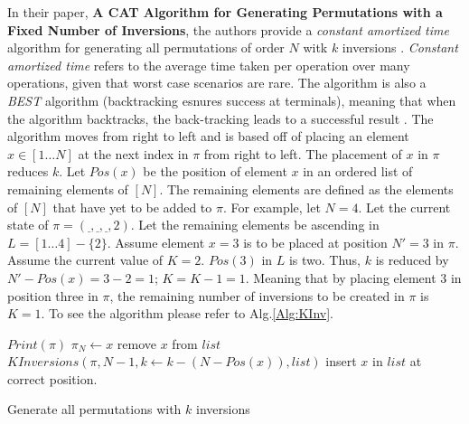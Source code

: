 In their paper, \textbf{A CAT Algorithm for Generating Permutations with a Fixed Number of Inversions}, the authors provide a 
\emph{constant amortized time} algorithm for generating all permutations of order $N$ witk $k$ inversions \cite{A26}. \emph{Constant amortized time}
refers to the average time taken per operation over many operations, given that worst case scenarios are rare. 
The algorithm is also a \emph{BEST} algorithm (backtracking esnures success at terminals), meaning that when the algorithm backtracks, 
the back-tracking leads to a successful result \cite{A26}. The algorithm moves from right to left and 
is based off of placing  an element $x \in [1 \dots N]$ at the next index in $\pi$ from right to left. The placement of $x$ in $\pi$ 
reduces $k$. Let $Pos(x)$ be the position of element $x$ in an ordered list of remaining elements of $[N]$. The remaining elements 
are defined as the elements of $[N]$ that have yet to be added to $\pi$.
For example,  let $N=4$. Let the current state of $\pi=(\underline{},\underline{},\underline{},2)$. Let the remaining elements be ascending in $L=[1 \dots 4] - \{2\}$. 
Assume element $x=3$ is to be placed at position $N'=3$ in $\pi$. Assume the current value of $K=2$. 
$Pos(3)$ in $L$ is two. Thus, $k$ is reduced by $N'-Pos(x)=3-2=1$; $K = K -1=1$. 
Meaning that by placing element $3$ in position three in $\pi$, the remaining number of inversions to be created in $\pi$ is $K=1$.
To see the algorithm please refer to Alg.\ref{Alg:KInv}. 
\begin{algorithm}
    \begin{algorithmic}[1]
                \State $Print(\pi)$
            \Else
                        $\pi_{N} \gets x$
                        \State remove $x$ from $list$ 
                        \State $KInversions(\pi, N-1, k \gets k - (N - Pos(x)), list)$
                        \State insert $x$ in $list$ at correct position.
                    \EndIf
                \EndFor
            \EndIf
        \EndFunction
        
    \end{algorithmic}
    \caption{Generate all permutations with $k$ inversions}
    \label{Alg:KInv}
\end{algorithm}

